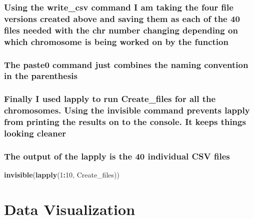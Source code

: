 \documentclass[
]{article}
\newenvironment{Shaded}{\begin{snugshade}}{\end{snugshade}}
\newcommand{\DecValTok}[1]{\textcolor[rgb]{0.00,0.00,0.81}{#1}}
\newcommand{\FunctionTok}[1]{\textcolor[rgb]{0.13,0.29,0.53}{\textbf{#1}}}
\newcommand{\NormalTok}[1]{#1}
\newcommand{\SpecialCharTok}[1]{\textcolor[rgb]{0.81,0.36,0.00}{\textbf{#1}}}
\begin{document}
\subsubsection{Using the write\_csv command I am taking the four file
versions created above and saving them as each of the 40 files needed
with the chr number changing depending on which chromosome is being
worked on by the
function}\label{using-the-write_csv-command-i-am-taking-the-four-file-versions-created-above-and-saving-them-as-each-of-the-40-files-needed-with-the-chr-number-changing-depending-on-which-chromosome-is-being-worked-on-by-the-function}

\subsubsection{The paste0 command just combines the naming convention in
the
parenthesis}\label{the-paste0-command-just-combines-the-naming-convention-in-the-parenthesis}

\subsubsection{Finally I used lapply to run Create\_files for all the
chromosomes. Using the invisible command prevents lapply from printing
the results on to the console. It keeps things looking
cleaner}\label{finally-i-used-lapply-to-run-create_files-for-all-the-chromosomes.-using-the-invisible-command-prevents-lapply-from-printing-the-results-on-to-the-console.-it-keeps-things-looking-cleaner}

\subsubsection{\texorpdfstring{\textbf{The output of the lapply is the
40 individual CSV
files}}{The output of the lapply is the 40 individual CSV files}}\label{the-output-of-the-lapply-is-the-40-individual-csv-files}

\begin{Shaded}
\begin{Highlighting}[]
\FunctionTok{invisible}\NormalTok{(}\FunctionTok{lapply}\NormalTok{(}\DecValTok{1}\SpecialCharTok{:}\DecValTok{10}\NormalTok{, Create\_files))}
\end{Highlighting}
\end{Shaded}

\section{Data Visualization}\label{data-visualization}
\end{document}

